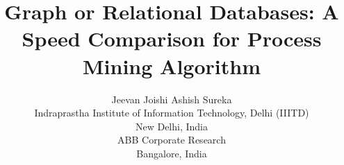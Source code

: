 \documentclass[11pt]{article}
\begin{document}
\title{Graph or Relational Databases: A Speed Comparison for Process Mining Algorithm} 
\author{Jeevan Joishi \quad Ashish Sureka\\
Indraprastha Institute of Information Technology, Delhi (IIITD)\\
       New Delhi, India\\
ABB Corporate Research\\
       Bangalore, India
}


\maketitle


%
\end{document}
